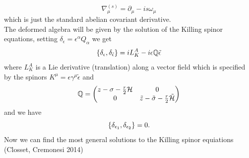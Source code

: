 \documentclass[11pt]{article}
\theoremstyle{definition}
\numberwithin{equation}{section}
\begin{document}
\begin{equation}
	\nabla_{\mu}^{(s)} = \partial_{\mu}-is\omega_{\mu}
\end{equation}
which is just the standard abelian covariant derivative.\\
The deformed algebra will be given by the solution of the Killing spinor equations, setting $\delta_{\epsilon}=\epsilon^{\alpha}Q_{\alpha}$ we get
\begin{equation}
	\acomm{\delta_{\epsilon}}{\delta_{\tilde{\epsilon}}} = iL_{K}^{A}-i\epsilon \mathbb{Q} \tilde{\epsilon}
\end{equation}
where $L_{K}^{A}$ is a Lie derivative (translation) along a vector field which is specified by the spinors $K^{\mu} = \epsilon\gamma^{\mu}\tilde{\epsilon}$ and 
\begin{equation}
	\mathbb{Q} = \mqty(z-\sigma-\frac{r}{2}\mathcal{H} & 0 \\ 0 & \tilde{z}-\tilde{\sigma}-\frac{r}{2}\tilde{\mathcal{H}})
\end{equation}
and we have
\begin{equation}
	\acomm{\delta_{\epsilon_{1}}}{\delta_{\epsilon_{2}}} = 0.
\end{equation}
Now we can find the most general solutions to the Killing spinor equiations (Closset, Cremonesi 2014)
\end{document}
